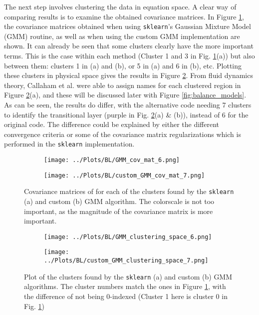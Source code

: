 \documentclass[12pt]{report} %
\begin{document}
The next step involves clustering the data in equation space. A clear way of comparing results is to examine the obtained covariance matrices. In Figure \ref{fig:GMM_cov_mat}, the covariance matrices obtained when using \texttt{sklearn}’s Gaussian Mixture Model (GMM) routine, as well as when using the custom GMM implementation are shown. It can already be seen that some clusters clearly have the more important terms. This is the case within each method (Cluster 1 and 3 in Fig. \ref{fig:GMM_cov_mat}(a)) but also between them: clusters 1 in (a) and (b), or 5 in (a) and 6 in (b), etc. Plotting these clusters in physical space gives the results in Figure \ref{fig:GMM_clusters}. From fluid dynamics theory, Callaham et al. were able to assign names for each clustered region in Figure \ref{fig:GMM_clusters}(a), and these will be discussed later with Figure \ref{fig:balance_models}. As can be seen, the results do differ, with the alternative code needing 7 clusters to identify the transitional layer (purple in Fig. \ref{fig:GMM_clusters}(a) \& (b)), instead of 6 for the original code. The difference could be explained by either the different convergence criteria or some of the covariance matrix regularizations which is performed in the \texttt{sklearn} implementation\cite{sklearnGMM}.

\begin{figure}[htbp]
  \centering
  \begin{subfigure}[b]{0.7\textwidth}
      \texttt{[image: ../Plots/BL/GMM\_cov\_mat\_6.png]}
      \caption{}
  \end{subfigure}
  \begin{subfigure}[b]{0.7\textwidth}
      \texttt{[image: ../Plots/BL/custom\_GMM\_cov\_mat\_7.png]}
      \caption{}
  \end{subfigure}
  \caption{Covariance matrices of for each of the clusters found by the \texttt{sklearn} (a) and custom (b) GMM algorithm. The colorscale is not too important, as the magnitude of the covariance matrix is more important.}
  \label{fig:GMM_cov_mat}
\end{figure}


\begin{figure}[htbp]
  \centering
  \begin{subfigure}[b]{0.7\textwidth}
      \texttt{[image: ../Plots/BL/GMM\_clustering\_space\_6.png]}
      \caption{}
  \end{subfigure}
  \begin{subfigure}[b]{0.7\textwidth}
      \texttt{[image: ../Plots/BL/custom\_GMM\_clustering\_space\_7.png]}
      \caption{}
  \end{subfigure}
  \caption{Plot of the clusters found by the \texttt{sklearn} (a) and custom (b) GMM algorithms. The cluster numbers match the ones in Figure \ref{fig:GMM_cov_mat}, with the difference of not being 0-indexed (Cluster 1 here is cluster 0 in Fig. \ref{fig:GMM_cov_mat})}
  \label{fig:GMM_clusters}
\end{figure}
\end{document}
